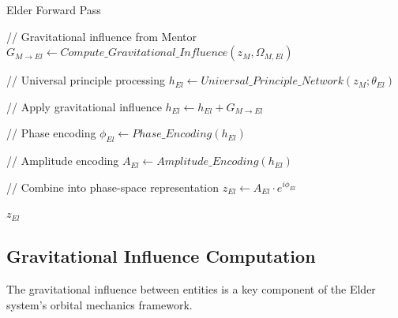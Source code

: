 \begin{algorithm}
\caption{Elder Forward Pass}
\begin{algorithmic}[1]
    \State // Gravitational influence from Mentor
    \State $G_{M \rightarrow El} \gets Compute\_Gravitational\_Influence(z_M, \Omega_{M,El})$
    
    \State // Universal principle processing
    \State $h_{El} \gets Universal\_Principle\_Network(z_M; \theta_{El})$
    
    \State // Apply gravitational influence
    \State $h_{El} \gets h_{El} + G_{M \rightarrow El}$
    
    \State // Phase encoding
    \State $\phi_{El} \gets Phase\_Encoding(h_{El})$
    
    \State // Amplitude encoding
    \State $A_{El} \gets Amplitude\_Encoding(h_{El})$
    
    \State // Combine into phase-space representation
    \State $z_{El} \gets A_{El} \cdot e^{i \phi_{El}}$
    
    \State \Return $z_{El}$
\EndFunction
\end{algorithmic}
\end{algorithm}

\subsection{Gravitational Influence Computation}

The gravitational influence between entities is a key component of the Elder system's orbital mechanics framework.

